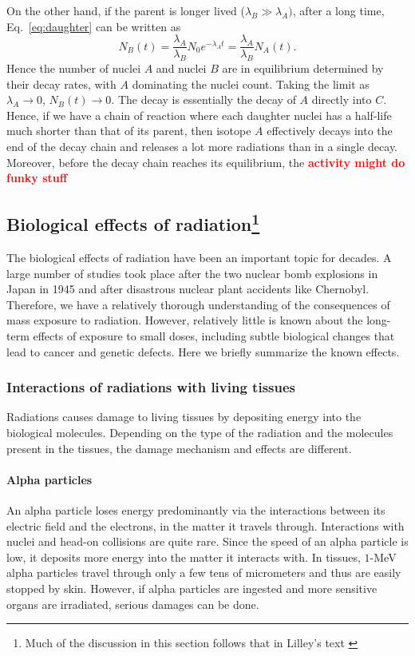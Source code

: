 \documentclass[nofootinbib,preprint,aps]{revtex4-1}
\newcommand{\red}[1]{\textcolor{red}{\bf #1}}
\begin{document}
        On the other hand, if the parent is longer lived
        ($\lambda_B \gg \lambda_A)$, after a long time, Eq.~\ref{eq:daughter} can be written as
        \begin{equation}
            N_B(t)=\frac{\lambda_A}{\lambda_B}N_0 e^{-\lambda_A t}=\frac{\lambda_A}{\lambda_B}N_A(t).
        \end{equation}
        Hence the number of nuclei $A$ and nuclei $B$ are in equilibrium determined by their decay rates, with
        $A$ dominating the nuclei count. Taking the limit as $\lambda_A \rightarrow 0$, $N_B(t)\rightarrow 0$.
        The decay is essentially the decay of $A$ directly into $C$. Hence, if we have a chain of reaction
        where each daughter nuclei has a half-life much shorter than that of its parent, then 
        isotope $A$ effectively decays into the end of the decay chain and releases a lot more radiations than
        in a single decay. Moreover, before the decay chain reaches its equilibrium, the \red{activity might do
        funky stuff}

        \subsection{Biological effects of radiation\footnote{Much of the discussion in this section follows that in
        Lilley's text \cite[chapt. 7]{l01}}}
        The biological effects of radiation have been an important topic for decades. A large
        number of studies took place after the two nuclear bomb explosions in Japan in 1945
        and after disastrous nuclear plant accidents like Chernobyl. Therefore, we have a relatively
        thorough understanding of the consequences of mass exposure to radiation. However, relatively
        little is known about the long-term effects of exposure to small doses, including subtle biological
        changes that lead to cancer and genetic defects. Here we briefly summarize the known effects.
        \subsubsection{Interactions of radiations with living tissues}
        Radiations causes damage to living tissues by depositing energy into the biological molecules.
        Depending on the type of the radiation
        and the molecules present in the tissues, the damage mechanism and effects are different.
        \paragraph{Alpha particles} An alpha particle loses energy predominantly via the interactions between its electric
        field and the electrons, in the matter it travels through. Interactions with nuclei and head-on collisions
        are quite rare. Since the speed of an alpha particle is low, it deposits more energy into the matter it
        interacts with. In tissues, $1$-MeV alpha particles travel through only a few tens of micrometers and thus
        are easily stopped by skin. However, if alpha particles are ingested and more sensitive organs are irradiated,
        serious damages can be done.
\end{document}
